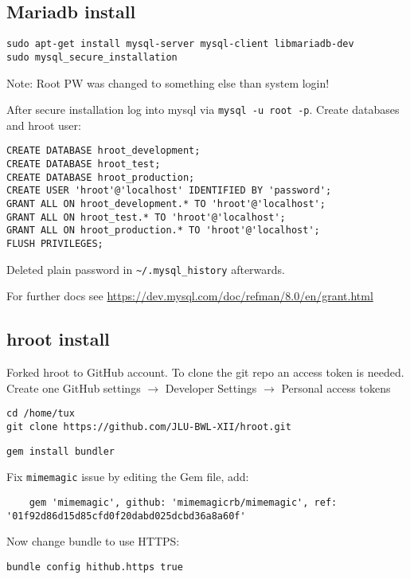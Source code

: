 \documentclass{article}
\begin{document}
\subsection{Mariadb install}
\begin{lstlisting}
sudo apt-get install mysql-server mysql-client libmariadb-dev
sudo mysql_secure_installation
\end{lstlisting}

Note: Root PW was changed to something else than system login!

After secure installation log into mysql via \verb|mysql -u root -p|.
Create databases and hroot user:
\begin{lstlisting}
CREATE DATABASE hroot_development;
CREATE DATABASE hroot_test;
CREATE DATABASE hroot_production;
CREATE USER 'hroot'@'localhost' IDENTIFIED BY 'password';
GRANT ALL ON hroot_development.* TO 'hroot'@'localhost'; 
GRANT ALL ON hroot_test.* TO 'hroot'@'localhost'; 
GRANT ALL ON hroot_production.* TO 'hroot'@'localhost';
FLUSH PRIVILEGES;
\end{lstlisting}

Deleted plain password in \verb|~/.mysql_history| afterwards.

For further docs see \url{https://dev.mysql.com/doc/refman/8.0/en/grant.html}

\subsection{hroot install}
Forked hroot to GitHub account.
To clone the git repo an access token is needed.
Create one GitHub settings $\rightarrow$ Developer Settings $\rightarrow$ Personal access tokens
\begin{lstlisting}
cd /home/tux
git clone https://github.com/JLU-BWL-XII/hroot.git
\end{lstlisting}

\begin{lstlisting}
gem install bundler
\end{lstlisting}

Fix \verb|mimemagic| issue by editing the Gem file, add:
\begin{lstlisting}
    gem 'mimemagic', github: 'mimemagicrb/mimemagic', ref: '01f92d86d15d85cfd0f20dabd025dcbd36a8a60f'
\end{lstlisting}
Now change bundle to use HTTPS:
\begin{lstlisting}
bundle config hithub.https true
\end{lstlisting}
\end{document}
